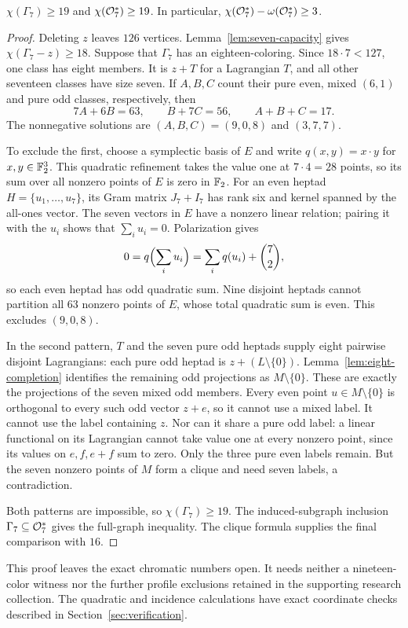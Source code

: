 \begin{theorem}\label{thm:seven-lower}
$\chi(\Gamma_7)\geq19$ and $\chi(\mathcal O_7^*)\geq19$.
In particular, $\chi(\mathcal O_7^*)-\omega(\mathcal O_7^*)\geq3$.
\end{theorem}
\begin{proof}
Deleting $z$ leaves $126$ vertices. Lemma~\ref{lem:seven-capacity}
gives $\chi(\Gamma_7-z)\geq18$. Suppose that $\Gamma_7$ has an
eighteen-coloring. Since $18\cdot7<127$, one class has eight
members. It is $z+T$ for a Lagrangian $T$, and all other seventeen
classes have size seven. If $A,B,C$ count their pure even,
mixed $(6,1)$ and pure odd classes, respectively, then
\[
7A+6B=63,\qquad B+7C=56,\qquad A+B+C=17.
\]
The nonnegative solutions are $(A,B,C)=(9,0,8)$ and $(3,7,7)$.

To exclude the first, choose a symplectic basis of $E$ and write
$q(x,y)=x\cdot y$ for $x,y\in\mathbb F_2^3$. This quadratic refinement
takes the value one at $7\cdot4=28$ points, so its sum over all
nonzero points of $E$ is zero in $\mathbb F_2$.
For an even heptad $H=\{u_1,\ldots,u_7\}$, its Gram matrix
$J_7+I_7$ has rank six and kernel spanned by the all-ones vector.
The seven vectors in $E$ have a nonzero linear relation; pairing
it with the $u_i$ shows that $\sum_i u_i=0$. Polarization gives
\[
0=q\Bigl(\sum_i u_i\Bigr)
 =\sum_i q(u_i)+\binom72,
\]
so each even heptad has odd quadratic sum. Nine disjoint heptads
cannot partition all $63$ nonzero points of $E$, whose total
quadratic sum is even. This excludes $(9,0,8)$.

In the second pattern, $T$ and the seven pure odd heptads supply
eight pairwise disjoint Lagrangians: each pure odd heptad is
$z+(L\setminus\{0\})$. Lemma~\ref{lem:eight-completion} identifies
the remaining odd projections as $M\setminus\{0\}$. These are
exactly the projections of the seven mixed odd members.
Every even point $u\in M\setminus\{0\}$ is orthogonal to every
such odd vector $z+e$, so it cannot use a mixed label. It cannot
use the label containing $z$. Nor can it share a pure odd label:
a linear functional on its Lagrangian cannot take value one
at every nonzero point, since its values on $e,f,e+f$ sum to zero.
Only the three pure even labels remain. But the seven nonzero points of
$M$ form a clique and need seven labels, a contradiction.

Both patterns are impossible, so $\chi(\Gamma_7)\geq19$.
The induced-subgraph inclusion $\Gamma_7\subseteq\mathcal O_7^*$ gives
the full-graph inequality. The clique formula supplies the final
comparison with $16$.
\end{proof}

This proof leaves the exact chromatic numbers open. It needs neither
a nineteen-color witness nor the further profile exclusions retained
in the supporting research collection.
The quadratic and incidence calculations have exact coordinate
checks described in Section~\ref{sec:verification}.
